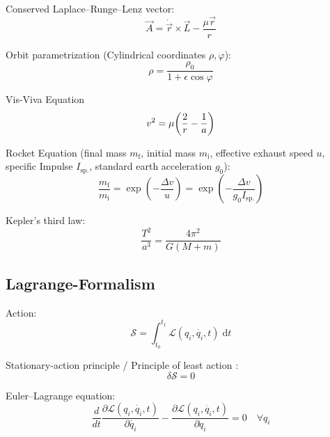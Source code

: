 		\noindent
		Conserved Laplace--Runge--Lenz vector:
		\begin{equation}
			\vec{A} = \dot{\vec{r}}\times\vec{L} - \frac{\mu \vec{r}}{r}
		\end{equation}

		\noindent
		Orbit parametrization (Cylindrical coordinates $\rho, \varphi$):
		\begin{equation}
			\rho = \frac{\rho_0}{1+\epsilon \cos\varphi}
		\end{equation}

		\noindent
		Vis-Viva Equation
		\begin{equation}
			v^2 = \mu\qty(\frac{2}{r} - \frac{1}{a})
		\end{equation}

		\noindent
		Rocket Equation (final mass $m_\text{f}$, initial mass $m_\text{i}$, effective exhaust speed $u$, specific Impulse $I_{\text{sp.}}$, standard earth acceleration $g_0$):
		\begin{equation}
			\frac{m_\text{f}}{m_\text{i}} = \exp(-\frac{\Delta v}{u}) = \exp(-\frac{\Delta v}{g_0 I_{\text{sp.}}})
		\end{equation}

		\noindent
		Kepler's third law:
		\begin{equation}
			\frac{T^2}{a^3} = \frac{4\pi^2}{G(M+m)}
		\end{equation}

	\subsection{Lagrange-Formalism}
		\noindent
		Action:
		\begin{equation}
			\mathcal{S}=\int_{t_0}^{t_1}\mathcal{L}(q_i, \dot{q_i},t)\;\mathrm{d} t
		\end{equation}

		\noindent
		Stationary-action principle / Principle of least action :
		\begin{equation}
			\delta \mathcal{S}=0
		\end{equation}

		\noindent
		Euler--Lagrange equation:
		\begin{equation}
			\frac{d}{dt} \frac{\partial \mathcal{L}(q_{i},\dot{q_{i}},t)}{\partial \dot{q_{i}}} - \frac{\partial \mathcal{L}(q_{i},\dot{q_{i}},t)}{\partial q_{i}} = 0 \quad \forall q_i
		\end{equation}

